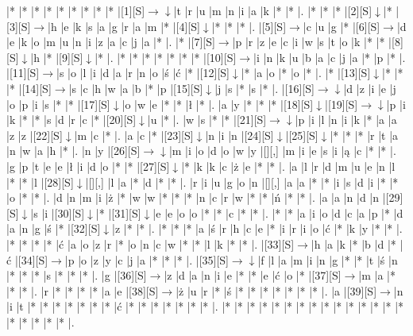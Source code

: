 \documentclass[11pt]{article}
\newcommand\drarr{$\rightarrow \!\!\!\!\! \downarrow$}
\newcommand\rarr{$\rightarrow$}
\newcommand\darr{$\downarrow$}
\begin{document}
\noindent\begin{Puzzle}{19}{25}|*	|*	|*	|*	|*	|*	|*	|*	|*	|[1][S]\drarr	|t	|r	|u	|m	|n	|i	|a	|k	|*	|*	|.
|*	|*	|*	|[2][S]\darr	|*	|[3][S]\rarr	|h	|e	|k	|s	|a	|g	|r	|a	|m	|*	|[4][S]\darr	|*	|*	|*	|.
|[5][S]\rarr	|c	|u	|g	|*	|[6][S]\rarr	|d	|e	|k	|o	|m	|u	|n	|i	|z	|a	|c	|j	|a	|*	|.
|*	|[7][S]\rarr	|p	|r	|z	|e	|c	|i	|w	|s	|t	|o	|k	|*	|*	|[8][S]\darr	|h	|*	|[9][S]\darr	|*	|.
|*	|*	|*	|*	|*	|*	|*	|[10][S]\rarr	|i	|n	|k	|u	|b	|a	|c	|j	|a	|*	|p	|*	|.
|[11][S]\rarr	|s	|o	|l	|i	|d	|a	|r	|n	|o	|ś	|ć	|*	|[12][S]\darr	|*	|a	|o	|*	|o	|*	|.
|*	|[13][S]\darr	|*	|*	|*	|[14][S]\rarr	|s	|c	|h	|w	|a	|b	|*	|p	|[15][S]\darr	|j	|s	|*	|s	|*	|.
|[16][S]\drarr	|d	|z	|i	|e	|j	|o	|p	|i	|s	|*	|*	|[17][S]\darr	|o	|w	|e	|*	|*	|ł	|*	|.
|a	|y	|*	|*	|*	|[18][S]\darr	|[19][S]\drarr	|p	|i	|k	|*	|*	|s	|d	|r	|c	|*	|[20][S]\darr	|u	|*	|.
|w	|s	|*	|*	|[21][S]\drarr	|p	|i	|l	|n	|i	|k	|*	|a	|a	|z	|z	|[22][S]\darr	|m	|c	|*	|.
|a	|c	|*	|[23][S]\darr	|n	|i	|n	|[24][S]\darr	|[25][S]\darr	|*	|*	|*	|r	|t	|a	|n	|w	|a	|h	|*	|.
|n	|y	|[26][S]\drarr	|m	|i	|o	|d	|o	|w	|y	|[][,]{ }	|m	|i	|e	|s	|i	|ą	|c	|*	|*	|.
|g	|p	|t	|e	|e	|ł	|i	|d	|o	|*	|*	|[27][S]\darr	|*	|k	|k	|c	|ż	|e	|*	|*	|.
|a	|l	|r	|d	|m	|u	|e	|n	|l	|*	|*	|l	|[28][S]\darr	|[][,]{ }	|l	|a	|*	|d	|*	|*	|.
|r	|i	|u	|g	|o	|n	|[][,]{ }	|a	|a	|*	|*	|i	|s	|d	|i	|*	|*	|o	|*	|*	|.
|d	|n	|m	|i	|ż	|*	|w	|w	|*	|*	|*	|n	|c	|r	|w	|*	|*	|ń	|*	|*	|.
|a	|a	|n	|d	|n	|[29][S]\darr	|s	|i	|[30][S]\darr	|*	|[31][S]\darr	|e	|e	|o	|o	|*	|*	|c	|*	|*	|.
|*	|*	|a	|i	|o	|d	|c	|a	|p	|*	|d	|a	|n	|g	|ś	|*	|[32][S]\darr	|z	|*	|*	|.
|*	|*	|*	|a	|ś	|r	|h	|c	|e	|*	|i	|r	|i	|o	|ć	|*	|k	|y	|*	|*	|.
|*	|*	|*	|*	|ć	|a	|o	|z	|r	|*	|o	|n	|c	|w	|*	|*	|l	|k	|*	|*	|.
|[33][S]\rarr	|h	|a	|k	|*	|b	|d	|*	|ć	|[34][S]\rarr	|p	|o	|z	|y	|c	|j	|a	|*	|*	|*	|.
|[35][S]\drarr	|f	|l	|a	|m	|i	|n	|g	|*	|*	|t	|ś	|n	|*	|*	|*	|s	|*	|*	|*	|.
|g	|[36][S]\rarr	|z	|d	|a	|n	|i	|e	|*	|*	|e	|ć	|o	|*	|[37][S]\rarr	|m	|a	|*	|*	|*	|.
|r	|*	|*	|*	|*	|a	|e	|[38][S]\rarr	|ż	|u	|r	|*	|ś	|*	|*	|*	|*	|*	|*	|*	|.
|a	|[39][S]\rarr	|n	|i	|t	|*	|*	|*	|*	|*	|*	|*	|ć	|*	|*	|*	|*	|*	|*	|*	|.
|*	|*	|*	|*	|*	|*	|*	|*	|*	|*	|*	|*	|*	|*	|*	|*	|*	|*	|*	|*	|.\end{Puzzle}

\newpage
\end{document}
